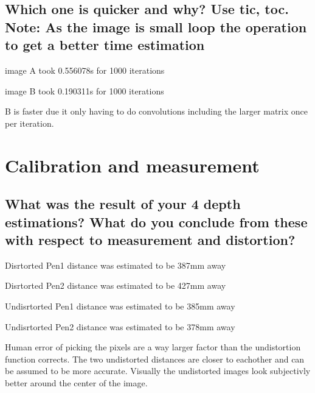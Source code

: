 \subsection{Which one is quicker and why? Use tic, toc. Note: As the image is small loop the operation to get a better time estimation}
image A took 0.556078s for 1000 iterations

image B took 0.190311s for 1000 iterations

B is faster due it only having to do convolutions including the larger matrix once per iteration.
\section{Calibration and measurement}
\subsection{What was the result of your 4 depth estimations? What do you conclude from these with respect to measurement and distortion?}
Disrtorted Pen1 distance was estimated to be 387mm away

Disrtorted Pen2 distance was estimated to be 427mm away

Undisrtorted Pen1 distance was estimated to be 385mm away

Undisrtorted Pen2 distance was estimated to be 378mm away

Human error of picking the pixels are a way larger factor than the undistortion function corrects. The two undistorted distances are closer to eachother and can be assumed to be more accurate. Visually the undistorted images look subjectivly better around the center of the image.
